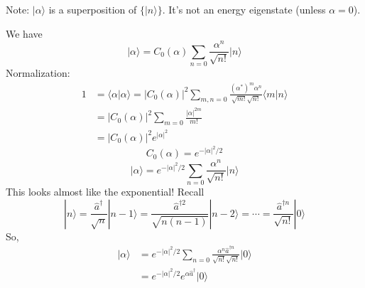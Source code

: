 Note: $|\alpha\rangle$ is a superposition of $\{|n\rangle\}$. It's not an energy eigenstate (unless $\alpha=0$).

We have
\[ |\alpha \rangle =C_0\left( \alpha \right) \sum_{n=0}{\frac{\alpha ^n}{\sqrt{n!}}|n\rangle}\]
Normalization:
\begin{align*}
    1&=\langle \alpha |\alpha \rangle =\left| C_0\left( \alpha \right) \right|^2\sum_{m,n=0}{\frac{\left( \alpha ^* \right) ^m\alpha ^n}{\sqrt{m!}\sqrt{n!}}\langle m|n\rangle}\\
    &=\left| C_0\left( \alpha \right) \right|^2\sum_{m=0}{\frac{\left| \alpha \right|^{2m}}{m!}}\\
    &=\left| C_0\left( \alpha \right) \right|^2e^{\left| \alpha \right|^2}
\end{align*}
\[ C_0\left( \alpha \right) =e^{-\left| \alpha \right|^2/2}\]
\[ |\alpha \rangle =e^{-\left| \alpha \right|^2/2}\sum_{n=0}{\frac{\alpha ^n}{\sqrt{n!}}|n\rangle}\]
This looks almost like the exponential! Recall
\[ |n\rangle =\frac{\hat{a}^{\dagger}}{\sqrt{n}}|n-1\rangle =\frac{\hat{a}^{\dagger 2}}{\sqrt{n\left( n-1 \right)}}|n-2\rangle =\cdots =\frac{\hat{a}^{\dagger n}}{\sqrt{n!}}|0\rangle \]
So,
\begin{align*}
    |\alpha \rangle &=e^{-\left| \alpha \right|^2/2}\sum_{n=0}{\frac{\alpha ^n\hat{a}^{\dagger n}}{\sqrt{n!}\sqrt{n!}}|0\rangle}\\
    &=e^{-\left| \alpha \right|^2/2}e^{\alpha \hat{a}^{\dagger}}|0\rangle
\end{align*}
